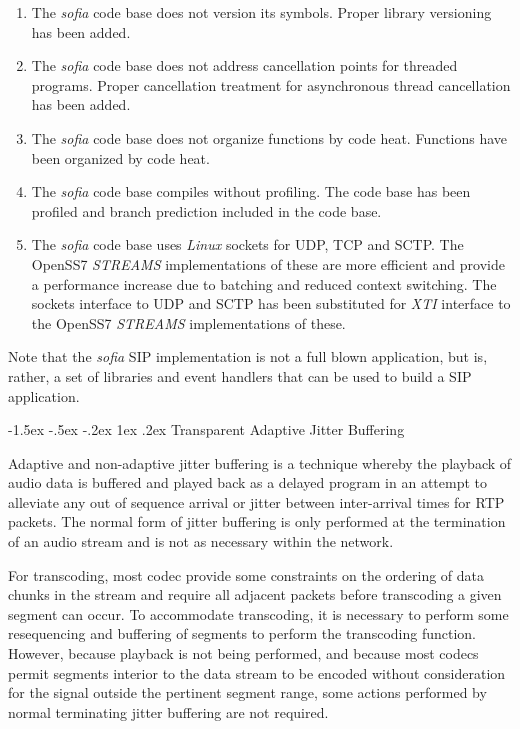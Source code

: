 \documentclass[letterpaper,final,notitlepage,twocolumn,10pt,twoside]{article}
\makeatletter
\let\normalsize = \small
\let\small = \footnotesize
\let\footnotesize = \scriptsize
\let\scriptsize = \tiny
\renewcommand\subsection{\@startsection{subsection}{2}{\z@}%
                                     {-1.5ex \@plus -.5ex \@minus -.2ex}%
                                     {1ex \@plus .2ex}%
                                     {\normalfont\normalsize\bfseries}}
\makeatother
\begin{document}
\begin{enumerate}

\item The {\sl sofia} code base does not version its symbols.  Proper library
versioning has been added.

\item The {\sl sofia} code base does not address cancellation points for
threaded programs.  Proper cancellation treatment for asynchronous thread
cancellation has been added.

\item The {\sl sofia} code base does not organize functions by code heat.
Functions have been organized by code heat.

\item The {\sl sofia} code base compiles without profiling.  The code base
has been profiled and branch prediction included in the code base.

\item The {\sl sofia} code base uses {\sl Linux} sockets for UDP, TCP and
SCTP.  The OpenSS7 {\sl STREAMS} implementations of these are more efficient
and provide a performance increase due to batching and reduced context
switching.  The sockets interface to UDP and SCTP has been substituted for
{\sl XTI} interface to the OpenSS7 {\sl STREAMS} implementations of these.

\end{enumerate}

Note that the {\sl sofia} SIP implementation is not a full blown application,
but is, rather, a set of libraries and event handlers that can be used to
build a SIP application.

\subsection{Transparent Adaptive Jitter Buffering}
\label{section:tajb}

Adaptive and non-adaptive jitter buffering is a technique whereby the playback
of audio data is buffered and played back as a delayed program in an attempt to
alleviate any out of sequence arrival or jitter between inter-arrival times for
RTP packets.  The normal form of jitter buffering is only performed at the
termination of an audio stream and is not as necessary within the network.

For transcoding, most codec provide some constraints on the ordering of data
chunks in the stream and require all adjacent packets before transcoding a given
segment can occur.  To accommodate transcoding, it is necessary to perform some
resequencing and buffering of segments to perform the transcoding function.
However, because playback is not being performed, and because most codecs permit
segments interior to the data stream to be encoded without consideration for the
signal outside the pertinent segment range, some actions performed by normal
terminating jitter buffering are not required.
\end{document}
